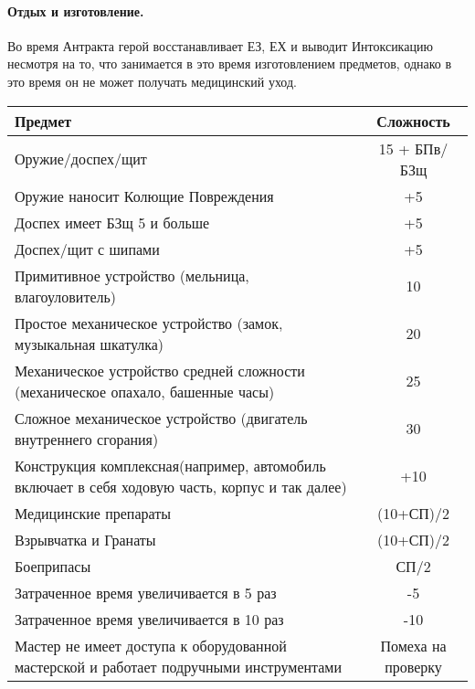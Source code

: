 \paragraph{Отдых и изготовление.}
Во время Антракта герой восстанавливает ЕЗ, ЕХ и выводит Интоксикацию несмотря на то, что занимается в это время изготовлением предметов, однако в это время он не может получать медицинский уход.
\begin{center}
\begin{tabular}{|p{10cm}|c|}
\hline
Предмет & Сложность \\ \hline
Оружие/доспех/щит & 15 + БПв/БЗщ \\ \hline
Оружие наносит Колющие Повреждения & +5 \\ \hline
Доспех имеет БЗщ 5 и больше & +5 \\ \hline
Доспех/щит с шипами & +5 \\ \hline
Примитивное устройство (мельница, влагоуловитель) & 10 \\ \hline
Простое механическое устройство (замок, музыкальная шкатулка) & 20 \\ \hline
Механическое устройство средней сложности (механическое опахало, башенные часы) & 25 \\ \hline
Сложное механическое устройство (двигатель внутреннего сгорания) & 30 \\ \hline
Конструкция комплексная(например, автомобиль включает в себя ходовую часть, корпус и так далее) & +10 \\ \hline
Медицинские препараты & (10+СП)/2 \\ \hline
Взрывчатка и Гранаты & (10+СП)/2 \\ \hline
Боеприпасы & СП/2 \\ \hline
Затраченное время увеличивается в 5 раз & -5 \\ \hline
Затраченное время увеличивается в 10 раз & -10 \\ \hline
Мастер не имеет доступа к оборудованной мастерской и работает подручными инструментами & Помеха на проверку \\ \hline
\end{tabular}
\end{center}
